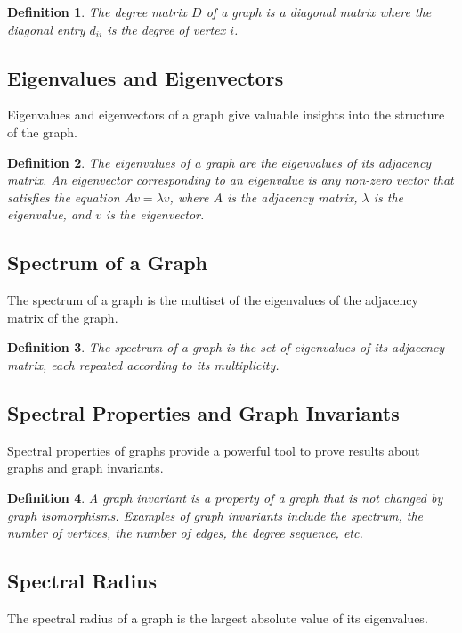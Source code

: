 \documentclass{article}
\newtheorem{definition}{Definition}
\begin{document}
\begin{definition}
	The \textit{degree matrix} \(D\) of a graph is a diagonal matrix where the diagonal entry \(d_{ii}\) is the degree of vertex \(i\).
\end{definition}

\subsection{Eigenvalues and Eigenvectors}
Eigenvalues and eigenvectors of a graph give valuable insights into the structure of the graph.

\begin{definition}
	The \textit{eigenvalues} of a graph are the eigenvalues of its adjacency matrix. An \textit{eigenvector} corresponding to an eigenvalue is any non-zero vector that satisfies the equation \(Av = \lambda v\), where \(A\) is the adjacency matrix, \(\lambda\) is the eigenvalue, and \(v\) is the eigenvector.
\end{definition}

\subsection{Spectrum of a Graph}
The spectrum of a graph is the multiset of the eigenvalues of the adjacency matrix of the graph.

\begin{definition}
	The \textit{spectrum} of a graph is the set of eigenvalues of its adjacency matrix, each repeated according to its multiplicity.
\end{definition}

\subsection{Spectral Properties and Graph Invariants}
Spectral properties of graphs provide a powerful tool to prove results about graphs and graph invariants.

\begin{definition}
	A \textit{graph invariant} is a property of a graph that is not changed by graph isomorphisms. Examples of graph invariants include the spectrum, the number of vertices, the number of edges, the degree sequence, etc.
\end{definition}

\subsection{Spectral Radius}
The spectral radius of a graph is the largest absolute value of its eigenvalues.
\end{document}
